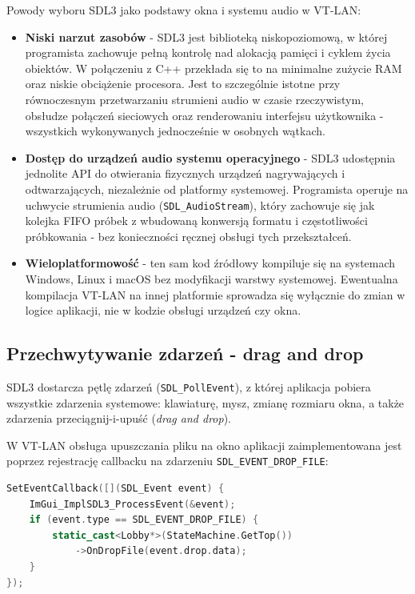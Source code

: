 Powody wyboru SDL3 jako podstawy okna i systemu audio w VT-LAN:

\begin{itemize}
	\item \textbf{Niski narzut zasobów} - SDL3 jest biblioteką niskopoziomową,
	w której programista zachowuje pełną kontrolę nad alokacją pamięci
	i cyklem życia obiektów. W połączeniu z C++ przekłada się to na minimalne zużycie RAM oraz
	niskie obciążenie procesora. Jest to szczególnie istotne przy równoczesnym
	przetwarzaniu strumieni audio w czasie rzeczywistym, obsłudze połączeń
	sieciowych oraz renderowaniu interfejsu użytkownika - wszystkich wykonywanych
	jednocześnie w osobnych wątkach.

	\item \textbf{Dostęp do urządzeń audio systemu operacyjnego} - SDL3
	udostępnia jednolite API do otwierania fizycznych urządzeń
	nagrywających i odtwarzających, niezależnie od platformy systemowej.
	Programista operuje na uchwycie strumienia audio (\texttt{SDL\_AudioStream}),
	który zachowuje się jak kolejka FIFO próbek z wbudowaną konwersją formatu
	i częstotliwości próbkowania - bez konieczności ręcznej obsługi tych
	przekształceń.

	\item \textbf{Wieloplatformowość} - ten sam kod źródłowy kompiluje się
	na systemach Windows, Linux i macOS bez modyfikacji warstwy systemowej.
	Ewentualna kompilacja VT-LAN na innej platformie sprowadza się wyłącznie
	do zmian w logice aplikacji, nie w kodzie obsługi urządzeń czy okna.
\end{itemize}

\subsection*{Przechwytywanie zdarzeń - drag and drop}

SDL3 dostarcza pętlę zdarzeń (\texttt{SDL\_PollEvent}),
z której aplikacja pobiera wszystkie zdarzenia systemowe: klawiaturę,
mysz, zmianę rozmiaru okna, a także zdarzenia przeciągnij-i-upuść
(\textit{drag and drop}).

W VT-LAN obsługa upuszczania pliku na okno aplikacji zaimplementowana
jest poprzez rejestrację callbacku na zdarzeniu \texttt{SDL\_EVENT\_DROP\_FILE}:

\begin{lstlisting}[language=C++, caption={Obsługa zdarzenia drag-and-drop w SDL3 (praca własna)}, label={lst:drop}]
SetEventCallback([](SDL_Event event) {
    ImGui_ImplSDL3_ProcessEvent(&event);
    if (event.type == SDL_EVENT_DROP_FILE) {
        static_cast<Lobby*>(StateMachine.GetTop())
            ->OnDropFile(event.drop.data);
    }
});
\end{lstlisting}

